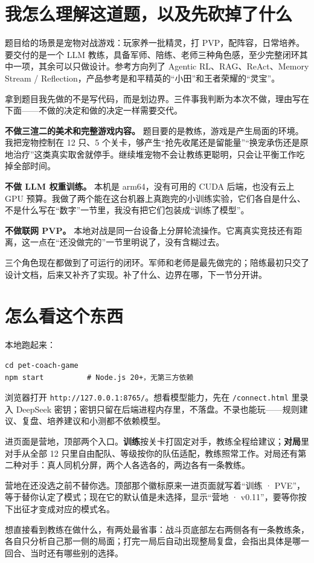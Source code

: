 \section{我怎么理解这道题，以及先砍掉了什么}

题目给的场景是宠物对战游戏：玩家养一批精灵，打 PVP，配阵容，日常培养。要交付的是一个 LLM 教练，具备军师、陪练、老师三种角色感，至少完整闭环其中一项，其余可以只做设计。参考方向列了 Agentic RL、RAG、ReAct、Memory Stream / Reflection，产品参考是和平精英的“小田”和王者荣耀的“灵宝”。

拿到题目我先做的不是写代码，而是划边界。三件事我判断为本次不做，理由写在下面——不做的决定和做的决定一样需要交代。

\textbf{不做三渲二的美术和完整游戏内容。} 题目要的是教练，游戏是产生局面的环境。我把宠物控制在 12 只、5 个关卡，够产生“抢先收尾还是留能量”“换宠承伤还是原地治疗”这类真实取舍就停手。继续堆宠物不会让教练更聪明，只会让平衡工作吃掉全部时间。

\textbf{不做 LLM 权重训练。} 本机是 arm64，没有可用的 CUDA 后端，也没有云上 GPU 预算。我做了两个能在这台机器上真跑完的小训练实验，它们各自是什么、不是什么写在“数字”一节里，我没有把它们包装成“训练了模型”。

\textbf{不做联网 PVP。} 本地对战是同一台设备上分屏轮流操作。它离真实竞技还有距离，这一点在“还没做完的”一节里明说了，没有含糊过去。

三个角色现在都做到了可运行的闭环。军师和老师是最先做完的；陪练最初只交了设计文档，后来又补齐了实现。补了什么、边界在哪，下一节分开讲。

\section{怎么看这个东西}

本地跑起来：

\begin{verbatim}
cd pet-coach-game
npm start          # Node.js 20+，无第三方依赖
\end{verbatim}

浏览器打开 \texttt{http://127.0.0.1:8765/}。想看模型能力，先在 \texttt{/connect.html} 里录入 DeepSeek 密钥；密钥只留在后端进程内存里，不落盘。不录也能玩——规则建议、复盘、培养建议和小测都不依赖模型。

进页面是营地，顶部两个入口。\textbf{训练}按关卡打固定对手，教练全程给建议；\textbf{对局}里对手从全部 12 只里自由配队、等级按你的队伍适配，教练照常工作。对局还有第二种对手：真人同机分屏，两个人各选各的，两边各有一条教练。

营地在还没选之前不替你选。顶部那个徽标原来一进页面就写着“训练 · PVE”，等于替你认定了模式；现在它的默认值是未选择，显示“营地 · v0.11”，要等你按下出征才变成对应的模式名。

想直接看到教练在做什么，有两处最省事：战斗页底部左右两侧各有一条教练条，各自只分析自己那一侧的局面；打完一局后自动出现整局复盘，会指出具体是哪一回合、当时还有哪些别的选择。
